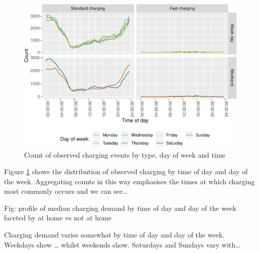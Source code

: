 \documentclass[]{article}
\newenvironment{Shaded}{\begin{snugshade}}{\end{snugshade}}
\newcommand{\KeywordTok}[1]{\textcolor[rgb]{0.13,0.29,0.53}{\textbf{#1}}}
\newcommand{\DataTypeTok}[1]{\textcolor[rgb]{0.13,0.29,0.53}{#1}}
\newcommand{\DecValTok}[1]{\textcolor[rgb]{0.00,0.00,0.81}{#1}}
\newcommand{\StringTok}[1]{\textcolor[rgb]{0.31,0.60,0.02}{#1}}
\newcommand{\CommentTok}[1]{\textcolor[rgb]{0.56,0.35,0.01}{\textit{#1}}}
\newcommand{\OperatorTok}[1]{\textcolor[rgb]{0.81,0.36,0.00}{\textbf{#1}}}
\newcommand{\NormalTok}[1]{#1}
\begin{document}
\begin{figure}
\centering
\includegraphics{EVBB_SummaryReport_files/figure-latex/chargeTime-1.pdf}
\caption{\label{fig:chargeTime}Count of observed charging events by type,
day of week and time}
\end{figure}

Figure \ref{fig:chargeTime} shows the distribution of observed charging
by time of day and day of the week. Aggregating counts in this way
emphasises the times at which charging most commonly occurs and we can
see\ldots{}

Fig: profile of median charging demand by time of day and day of the
week faceted by at home vs not at home

Charging demand varies somewhat by time of day and day of the week.
Weekdays show \ldots{} whilst weekends show. Saturdays and Sundays vary
with\ldots{}

\begin{Shaded}
\end{Shaded}
\end{document}
